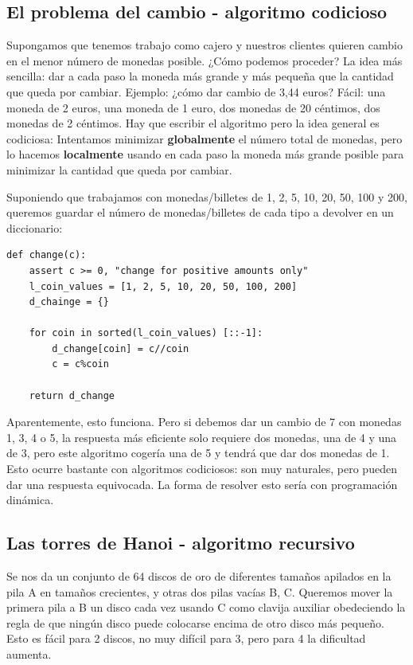 \subsection{El problema del cambio - algoritmo codicioso}
Supongamos que tenemos trabajo como cajero y nuestros clientes quieren cambio en el menor número de monedas posible. ¿Cómo podemos proceder? La idea más sencilla: dar a cada paso la moneda más grande y más pequeña que la cantidad que queda por cambiar. Ejemplo: ¿cómo dar cambio de 3,44 euros? Fácil: una moneda de 2 euros, una moneda de 1 euro, dos monedas de 20 céntimos, dos monedas de 2 céntimos. Hay que escribir el algoritmo pero la idea general es codiciosa: Intentamos minimizar \textbf{globalmente} el número total de monedas, pero lo hacemos \textbf{localmente} usando en cada paso la moneda más grande posible para minimizar la cantidad que queda por cambiar.

Suponiendo que trabajamos con monedas/billetes de 1, 2, 5, 10, 20, 50, 100 y 200, queremos guardar el número de monedas/billetes de cada tipo a devolver en un diccionario:
\begin{lstlisting}
def change(c):
	assert c >= 0, "change for positive amounts only"
	l_coin_values = [1, 2, 5, 10, 20, 50, 100, 200]
	d_chainge = {}
	
	for coin in sorted(l_coin_values) [::-1]:
		d_change[coin] = c//coin
		c = c%coin
		
	return d_change
\end{lstlisting}

Aparentemente, esto funciona. Pero si debemos dar un cambio de 7 con monedas 1, 3, 4 o 5, la respuesta más eficiente solo requiere dos monedas, una de 4 y una de 3, pero este algoritmo cogería una de 5 y tendrá que dar dos monedas de 1. Esto ocurre bastante con algoritmos codiciosos: son muy naturales, pero pueden dar una respuesta equivocada. La forma de resolver esto sería con programación dinámica.

\subsection{Las torres de Hanoi - algoritmo recursivo}
Se nos da un conjunto de 64 discos de oro de diferentes tamaños apilados en la pila A en tamaños crecientes, y otras dos pilas vacías B, C. Queremos mover la primera pila a B un disco cada vez usando C como clavija auxiliar obedeciendo la regla de que ningún disco puede colocarse encima de otro disco más pequeño. Esto es fácil para 2 discos, no muy difícil para 3, pero para 4 la dificultad aumenta. 

